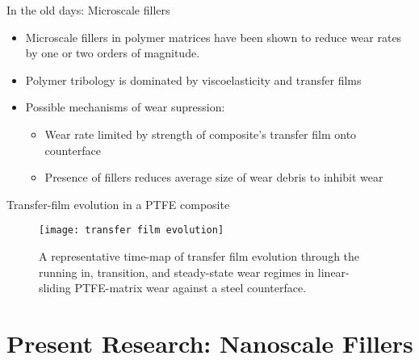 \documentclass[12pt,letterpaper]{beamer}
\begin{document}
\begin{frame}{In the old days: Microscale fillers}
\begin{itemize}
\item Microscale fillers in polymer matrices have been shown to reduce wear rates by one or two orders of magnitude. \cite{Lancaster1968549,Tanaka1982221}
\item Polymer tribology is dominated by viscoelasticity and transfer films \cite{bahadur2000development, liu_situ_2012, kragelski1965friction}
\item Possible mechanisms of wear supression:
\begin{itemize}
\item Wear rate limited by strength of composite's transfer film onto counterface \cite{Briscoe197799,ye2012transfer}
\item Presence of fillers reduces average size of wear debris to inhibit wear \cite{Bahadur19841, Blanchet1992229, Ricklin1977487}
\end{itemize}
\end{itemize}
\end{frame}

\begin{frame}{Transfer-film evolution in a PTFE composite}
\begin{figure}
  \centering
    \texttt{[image: transfer film evolution]}
    \caption[Time map of transfer film evolution from PTFE on steel]{A representative time-map of transfer film evolution through the running in, transition, and steady-state wear regimes in linear-sliding PTFE-matrix wear against a steel counterface.}
     \label{fig:transfer_films}
\end{figure}
\end{frame}

\section{Present Research: Nanoscale Fillers}
\end{document}
